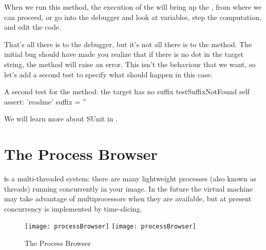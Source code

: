 \documentclass[a4paper,10pt,twoside]{book}
\begin{document}
When we run this method, the execution of the  will bring up the , from where we can proceed, or go into the debugger and look at variables, step the computation, and edit the code.

That's all there is to the debugger, but it's not all there is to the  method.  
The initial bug should have made you realize that if there is no dot in the target string, the  method will raise an error.  
This isn't the behaviour that we want, so let's add a second test to specify what should happen in this case.

\begin{method}[testNoSuffix]{A second test for the  method: the target has no suffix}
testSuffixNotFound
	self assert: 'readme' suffix = ''
\end{method}


We will learn more about SUnit in .


\section{The Process Browser}

\st is a multi-threaded system: there are many lightweight processes (also known as threads) running concurrently in your image. 
In the future the \pharo virtual machine may take advantage of multiprocessors when they are available, but at present concurrency is implemented by time-slicing.

\begin{figure}[btp]
	\begin{center}
	\ifluluelse
		{\texttt{[image: processBrowser]}}
		{\texttt{[image: processBrowser]}}
	\end{center}
	\caption{The Process Browser}
\end{figure}
\end{document}
